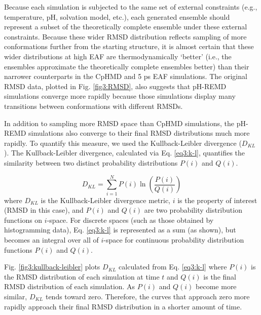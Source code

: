 Because each simulation is subjected to the same set of external constraints
(e.g., temperature, pH, solvation model, etc.), each generated ensemble should
represent a subset of the theoretically complete ensemble under these external
constraints.  Because these wider RMSD distribution reflects sampling of more
conformations further from the starting structure, it is almost certain that
these wider distributions at high EAF are thermodynamically `better' (i.e., the
ensembles approximate the theoretically complete ensembles better) than their
narrower counterparts in the CpHMD and 5 ps EAF simulations.  The
original RMSD data, plotted in Fig. \ref{fig3:RMSD}, also suggests that pH-REMD
simulations converge more rapidly because those simulations display many
transitions between conformations with different RMSDs.

In addition to sampling more RMSD space than CpHMD simulations, the pH-REMD
simulations also converge to their final RMSD distributions much more rapidly.
To quantify this measure, we used the Kullback-Leibler divergence
\cite{Hamacher2007, McClendon_JChemTheoryComput_2012_v8_p2115} ($D_{KL}$).  The
Kullback-Leibler divergence, calculated via Eq. \ref{eq3:k-l}, quantifies the
similarity between two distinct probability distributions $P(i)$ and $Q(i)$.

\begin{equation}
 D_{KL} = \sum _ {i=1} ^ N P(i) \ln \left( \frac{P(i)} {Q(i)} \right)
 \label{eq3:k-l}
\end{equation}
where $D_{KL}$ is the Kullback-Leibler divergence metric, $i$ is the property of
interest (RMSD in this case), and $P(i)$ and $Q(i)$ are two probability
distribution functions on $i$-space.  For discrete spaces (such as those
obtained by histogramming data), Eq. \ref{eq3:k-l} is represented as a sum (as
shown), but becomes an integral over all of $i$-space for continuous probability
distribution functions $P(i)$ and $Q(i)$.

Fig. \ref{fig3:kullback-leibler} plots $D_{KL}$ calculated from Eq.
\ref{eq3:k-l} where $P(i)$ is the RMSD distribution of each simulation at time
$t$ and $Q(i)$ is the final RMSD distribution of each simulation.  As $P(i)$ and
$Q(i)$ become more similar, $D_{KL}$ tends toward zero.  Therefore, the curves
that approach zero more rapidly approach their final RMSD distribution in a
shorter amount of time.

